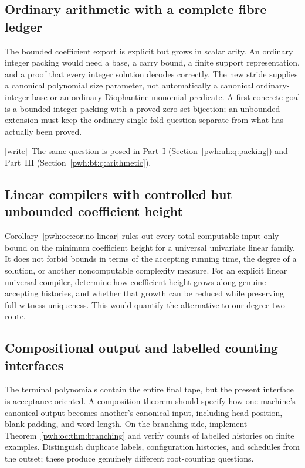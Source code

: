 \documentclass[11pt,letterpaper]{article}
\numberwithin{equation}{section}
\theoremstyle{definition}
\newcommand{\wtag}{\textup{[write]}}
\begin{document}
\subsection{Ordinary arithmetic with a complete fibre ledger}\label{pwh:oc:q:packing}

The bounded coefficient export is explicit but grows in scalar arity.
An ordinary integer packing would need a base, a carry bound, a finite
support representation, and a proof that every integer solution decodes
correctly. The new stride supplies a canonical polynomial size parameter,
not automatically a canonical ordinary-integer base or an ordinary
Diophantine monomial predicate. A first concrete goal is a bounded
integer packing with a proved zero-set bijection; an unbounded extension
must keep the ordinary single-fold question separate from what has
actually been proved.

\wtag\ The same question is posed in Part~I (Section~\ref{pwh:uh:q:packing})
and Part~III (Section~\ref{pwh:bt:q:arithmetic}).

\subsection{Linear compilers with controlled but unbounded coefficient height}

Corollary~\ref{pwh:oc:cor:no-linear} rules out every total computable input-only
bound on the minimum coefficient height for a universal univariate
linear family. It does not forbid bounds in terms of the accepting
running time, the degree of a solution, or another noncomputable
complexity measure. For an explicit linear universal compiler, determine
how coefficient height grows along genuine accepting histories, and
whether that growth can be reduced while preserving full-witness
uniqueness. This would quantify the alternative to our degree-two route.

\subsection{Compositional output and labelled counting interfaces}

The terminal polynomials contain the entire final tape, but the present
interface is acceptance-oriented. A composition theorem should specify
how one machine's canonical output becomes another's canonical input,
including head position, blank padding, and word length. On the branching
side, implement Theorem~\ref{pwh:oc:thm:branching} and verify counts of labelled
histories on finite examples. Distinguish duplicate labels, configuration
histories, and schedules from the outset; these produce genuinely
different root-counting questions.
\end{document}

